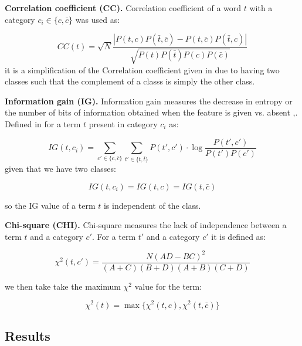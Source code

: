 \documentclass[10pt, a4paper]{article}
\begin{document}
\textbf{Correlation coefficient (CC).} Correlation coefficient of a word $t$ with a category $c_i \in \{c,\bar{c}\}$ was used as:

$$ CC(t) = \sqrt{N} \frac{| P(t,c)P(\bar{t},\bar{c}) - P(t,\bar{c})P(\bar{t},c) |}
				{\sqrt{P(t)P(\bar{t})P(c)P(\bar{c})}}
$$
it is a simplification of the Correlation coefficient given in \cite{IG} due to having two classes such that the complement of a classs is simply the other class.

\textbf{Information gain (IG).} Information gain measures the decrease in entropy or the number of bits of information obtained when the feature is given vs. absent \cite{Empirical},\cite{IG}. Defined in \cite{IG} for a term $t$ present in category $c_i$ as:

$$ IG(t,c_i) = \sum\limits_{c'\in\{ c,\bar{c} \}} \sum\limits_{t'\in\{ t,\bar{t} \}} P(t',c') \cdot \log \frac{P(t',c')}{P(t')P(c')} $$
given that we have two classes:

$$ IG(t,c_i) = IG(t,c) = IG(t,\bar{c}) $$

so the IG value of a term $t$ is independent of the class.

\textbf{Chi-square (CHI).} Chi-square measures the lack of independence between a term $t$ and a category $c'$. For a term $t'$ and a category $c'$ it is defined as:

$$\chi^2 (t,c') = \frac{N(AD-BC)^2}{(A+C)(B+D)(A+B)(C+D)}$$

we then take take the maximum $\chi^2$ value for the term:

$$\chi^2 (t) = \max\{\chi^2(t,c),\chi^2(t,\bar{c})\} $$

\subsection{Results}
\end{document}
